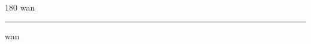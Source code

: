
\begin{frame}
\begin{center}
\begin{turn}{180}
{\fontsize{2.5cm}{1em}\selectfont wan}
\end{turn}
\vspace{1em}\par  
\hrule
\vspace{1em}\par  
{\fontsize{2.5cm}{1em}\selectfont wan}
\end{center}
\end{frame}
